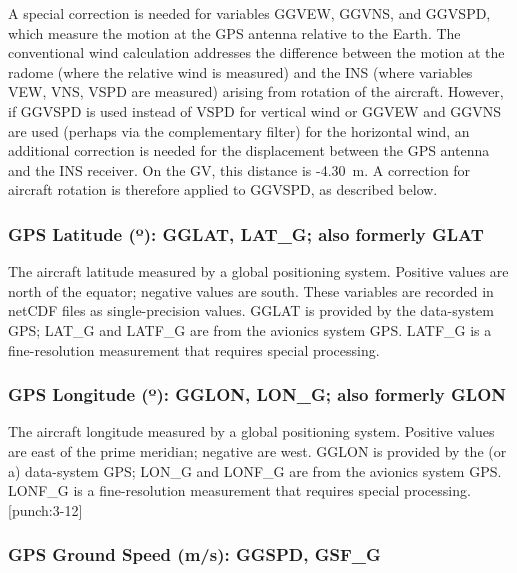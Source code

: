 \documentclass[
  english,
]{book}
\begin{document}
A special correction is needed for variables GGVEW, GGVNS, and GGVSPD, which measure the motion at the GPS antenna relative to the Earth. The conventional wind calculation addresses the difference between the motion at the radome (where the relative wind is measured) and the INS (where variables VEW, VNS, VSPD are measured) arising from rotation of the aircraft. However, if GGVSPD is used instead of VSPD for vertical wind or GGVEW and GGVNS are used (perhaps via the complementary filter) for the horizontal wind, an additional correction is needed for the displacement between the GPS antenna and the INS receiver. On the GV, this distance is -4.30~m. A correction for aircraft rotation is therefore applied to GGVSPD, as described below.

\hypertarget{gglat}{%
\subsubsection*{\texorpdfstring{GPS Latitude ({º}): GGLAT, LAT\_G; also formerly GLAT}{GPS Latitude (º): GGLAT, LAT\_G; also formerly GLAT}}\label{gglat}}

The aircraft latitude measured by a global positioning system. Positive values are north of the equator; negative values are south. These variables are recorded in netCDF files as single-precision values. GGLAT is provided by the data-system GPS; LAT\_G and LATF\_G are from the avionics system GPS. LATF\_G is a fine-resolution measurement that requires special processing.

\hypertarget{gglon}{%
\subsubsection*{\texorpdfstring{GPS Longitude ({º}): GGLON, LON\_G; also formerly GLON}{GPS Longitude (º): GGLON, LON\_G; also formerly GLON}}\label{gglon}}

The aircraft longitude measured by a global positioning system. Positive values are east of the prime meridian; negative are west. GGLON is provided by the (or a) data-system GPS; LON\_G and LONF\_G are from the avionics system GPS. LONF\_G is a fine-resolution measurement that requires special processing. \protect\hypertarget{punch:3-12}{}{{[}punch:3-12{]}}

\hypertarget{ggspd}{%
\subsubsection*{GPS Ground Speed (m/s): GGSPD, GSF\_G}\label{ggspd}}
\end{document}
